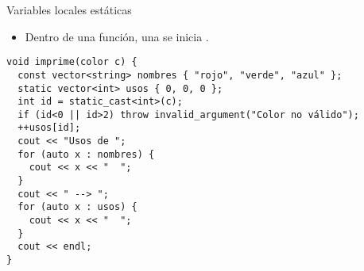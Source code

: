 \begin{frame}[t,fragile]{Variables locales estáticas}
\begin{itemize}
  \item Dentro de una función, una  
        se inicia .
\end{itemize}
\begin{lstlisting}
void imprime(color c) {
  const vector<string> nombres { "rojo", "verde", "azul" };
  static vector<int> usos { 0, 0, 0 };
  int id = static_cast<int>(c);
  if (id<0 || id>2) throw invalid_argument("Color no válido");
  ++usos[id];
  cout << "Usos de ";
  for (auto x : nombres) {
    cout << x << "  ";
  }
  cout << " --> ";
  for (auto x : usos) {
    cout << x << "  ";
  }
  cout << endl;
}
\end{lstlisting}
\end{frame}
